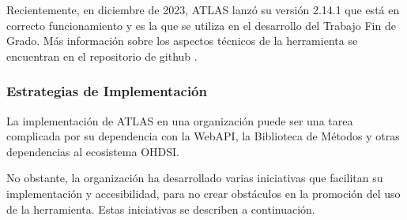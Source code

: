 Recientemente, en diciembre de 2023, ATLAS lanzó su versión 2.14.1 que está en correcto funcionamiento y es la que se utiliza en el desarrollo del Trabajo Fin de Grado. Más información sobre los aspectos técnicos de la herramienta se encuentran en el repositorio de github \cite{githubATLAS}.

\subsubsection{Estrategias de Implementación}

La implementación de ATLAS en una organización puede ser una tarea complicada por su dependencia con la WebAPI, la Biblioteca de Métodos y otras dependencias al ecosistema OHDSI. 

No obstante, la organización ha desarrollado varias iniciativas que facilitan su implementación y accesibilidad, para no crear obstáculos en la promoción del uso de la herramienta. Estas iniciativas se describen a continuación.


